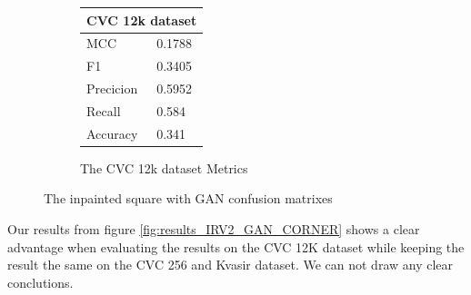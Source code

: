 \begin{figure}[h]
\begin{subfigure}[b]{0.25\textwidth}
        \begin{tabular}{ll}
        \toprule
        \multicolumn{2}{c}{CVC 12k dataset}        \\
        \midrule
        MCC 		& 0.1788 \\
        F1  		& 0.3405 \\
        Precicion  	& 0.5952 \\
        Recall     	& 0.584 \\
        Accuracy	& 0.341 \\
        \bottomrule
        \end{tabular}
\caption{The CVC 12k dataset Metrics}
\label{tab:cvc12k_metrics_IRV2_GAN_SQUARE}
\end{subfigure}
\caption{The inpainted square with GAN confusion matrixes}
\label{fig:results_IRV2_GAN_SQUARE}
\end{figure}
\FloatBarrier

Our results from figure \ref{fig:results_IRV2_GAN_CORNER} shows a clear advantage when evaluating the results on the CVC 12K dataset while keeping the result the same on the CVC 256 and Kvasir dataset. 
We can not draw any clear conclutions.




